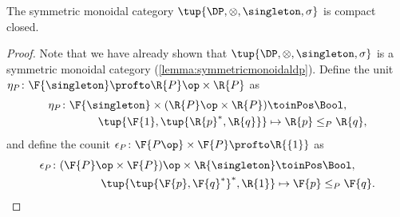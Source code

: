 \begin{lemma}
The symmetric monoidal category $\tup{\DP,\otimes,\singleton,\sigma}$ is compact closed.
\end{lemma}
\begin{proof}
Note that we have already shown that $\tup{\DP,\otimes,\singleton,\sigma}$ is a symmetric monoidal category (\cref{lemma:symmetricmonoidaldp}). Define the unit $\eta_P\colon \F{\singleton} \profto \R{P}\op \times \R{P} $ as
\begin{equation}
\label{eqn:unit_morphism}
\begin{aligned}
    \eta_P \colon \F{\singleton} \times (\R{P}\op \times \R{P}) & \toinPos \Bool, \\
            \tup{\F{1},\tup{\R{p}^*,\R{q}}} & \mapsto \R{p} \leq_P \R{q},
\end{aligned}
\end{equation}
and define the counit $\epsilon_P\colon \F{P\op} \times \F{P} \profto \R{\{1\}} $ as
\begin{equation}
\begin{aligned}
    \epsilon_P \colon (\F{P}\op \times \F{P})\op \times \R{\singleton} & \toinPos \Bool,  \\
            \tup{\tup{\F{p},\F{q}^*}^*, \R{1}} & \mapsto \F{p} \leq_P \F{q}.
\end{aligned}
\end{equation}


\end{proof}
